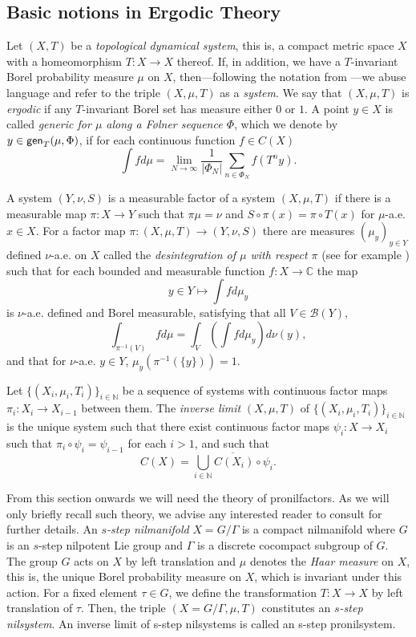 \documentclass[letter,11pt]{article}
\theoremstyle{definition}
\newcommand{\N}{\mathbb{N}}
\newcommand{\C}{\mathbb{C}}
\newcommand{\gen}{\mathop{\textup{\textsf{gen}}}}
\begin{document}
\subsection{Basic notions in Ergodic Theory}
Let $(X,T)$ be a \textit{topological dynamical system}, this is, a compact metric space $X$ with a homeomorphism $T:X\to X$ thereof. If, in addition, we have a $T$-invariant Borel probability measure $\mu$ on $X$, then—following the notation from \cite{Kra_Moreira_Richter_Robertson:2022}—we abuse language and refer to the triple $(X, \mu, T)$ as a \textit{system}. We say that $(X,\mu,T)$ is \textit{ergodic} if any $T$-invariant Borel set has measure either $0$ or $1$. A point $y\in X$ is called \textit{generic for $\mu$ along a F\o lner sequence $\Phi$}, which we denote by $y\in \gen_T(\mu,\Phi)$, if for each continuous function $f\in C(X)$
$$\int fd\mu =\lim_{N\to \infty} \frac{1}{|\Phi_N|} \sum_{n\in \Phi_N} f(T^ny). $$


A system $(Y,\nu,S)$ is a measurable factor of a system $(X,\mu,T)$ if there is a measurable map $\pi:X\to Y$ such that $\pi\mu=\nu$ and $S\circ \pi(x)= \pi\circ T(x)$ for $\mu$-a.e. $x\in X$. 
For a factor map $\pi:(X,\mu,T)\to (Y,\nu,S)$ there are measures $(\mu_y)_{y\in Y}$ defined $\nu$-a.e. on $X$ called the \textit{desintegration of $\mu$ with respect $\pi$} (see for example \cite[Theorem 5.14]{Einsiedler2011}) such that for each bounded and measurable function $f:X\to \C$ the map
    $$y\in Y \mapsto \int f d\mu_y $$
    is $\nu$-a.e. defined and Borel measurable, satisfying that all $V\in \mathcal{B}(Y)$, 
     $$\int_{\pi^{-1}(V)} f d\mu= \int_V \left( \int f d\mu_y\right) d\nu(y),$$
    and that for $\nu$-a.e. $y\in Y$, $\mu_{y}(\pi^{-1}(\{y\}))=1$. 

Let $\{(X_i,\mu_i,T_i)\}_{i\in \N}$ be a sequence of systems with continuous factor maps $\pi_i:X_i\to X_{i-1}$ between them. The \textit{inverse limit} $(X,\mu,T)$ of $\{(X_i,\mu_i,T_i)\}_{i\in \N}$ is the unique system such that there exist continuous factor maps $\psi_i:X\to X_i$ such that $\pi_i\circ \psi_i= \psi_{i-1}$ for each $i>1$, and such that 
$$C(X)=\overline{\bigcup_{i\in \N} C(X_i)\circ \psi_i}. $$


From this section onwards we will need the theory of pronilfactors. As we will only briefly recall such theory, we advise any interested reader to consult \cite{Host_Kra_nilpotent_structures_ergodic_theory:2018} for further details. An $s$\textit{-step nilmanifold} 
$X=G/\Gamma$ is a compact nilmanifold where $G$ is an $s$-step nilpotent Lie group and $\Gamma$ is a discrete cocompact subgroup of $G$. The group $G$ acts on $X$ by left translation and 
$\mu$ denotes the \textit{Haar measure} on $X$, this is, the unique Borel probability measure on $X$, which is invariant under this action. For a fixed element $\tau\in G$, we define the transformation $T:X\to X$ by left translation of $\tau$. Then, the triple $(X=G/\Gamma,\mu,T)$ constitutes an $s$\textit{-step nilsystem}.
An inverse limit of s-step nilsystems is called an s-step pronilsystem.
\end{document}
